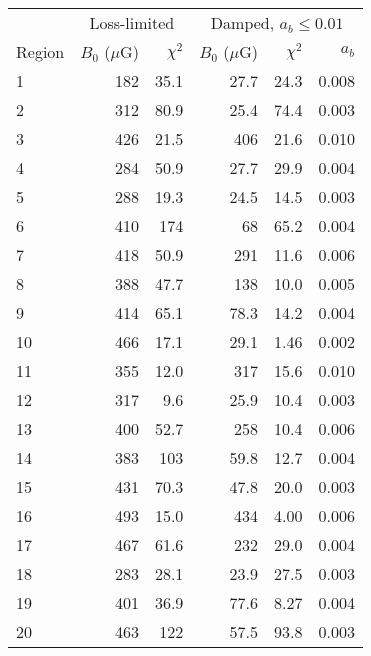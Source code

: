 \begin{tabular}{@{} l rr rrr @{}}
\toprule
{} & \multicolumn{2}{c}{Loss-limited}
   & \multicolumn{3}{c}{Damped, $a_b \leq 0.01$} \\
\cmidrule(lr){2-3} \cmidrule(l){4-6}
Region & $B_0$ ($\mu$G) & $\chi^2$
       & $B_0$ ($\mu$G) & $\chi^2$ & $a_b$ \\
\midrule
 1 & 182 & 35.1 & 27.7 & 24.3 & 0.008 \\
 2 & 312 & 80.9 & 25.4 & 74.4 & 0.003 \\
 3 & 426 & 21.5 & 406  & 21.6 & 0.010 \\
\cmidrule{1-6}
 4 & 284 & 50.9 & 27.7 & 29.9 & 0.004 \\
 5 & 288 & 19.3 & 24.5 & 14.5 & 0.003 \\
 6 & 410 & 174  & 68   & 65.2 & 0.004 \\
 7 & 418 & 50.9 & 291  & 11.6 & 0.006 \\
 8 & 388 & 47.7 & 138  & 10.0 & 0.005 \\
 9 & 414 & 65.1 & 78.3 & 14.2 & 0.004 \\
10 & 466 & 17.1 & 29.1 & 1.46 & 0.002 \\
\cmidrule{1-6}
11 & 355 & 12.0 & 317  & 15.6 & 0.010 \\
12 & 317 &  9.6 & 25.9 & 10.4 & 0.003 \\
13 & 400 & 52.7 & 258  & 10.4 & 0.006 \\
\cmidrule{1-6}
14 & 383 & 103  & 59.8 & 12.7 & 0.004 \\
15 & 431 & 70.3 & 47.8 & 20.0 & 0.003 \\
16 & 493 & 15.0 & 434  & 4.00 & 0.006 \\
17 & 467 & 61.6 & 232  & 29.0 & 0.004 \\
\cmidrule{1-6}
18 & 283 & 28.1 & 23.9 & 27.5 & 0.003 \\
19 & 401 & 36.9 & 77.6 & 8.27 & 0.004 \\
20 & 463 & 122  & 57.5 & 93.8 & 0.003 \\
\bottomrule
\end{tabular}

